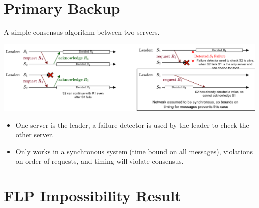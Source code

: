 \section{Primary Backup}
A simple consensus algorithm between two servers.
\begin{center}
    \includegraphics[width=.9\textwidth]{consensus/images/primary_backup_scenarios.drawio.png}
\end{center}
\begin{itemize}
    \item One server is the leader, a failure detector is used by the leader to check the other server.
    \item Only works in a synchronous system (time bound on all messages), violations on order of requests, and timing will violate consensus.
\end{itemize}

\section{FLP Impossibility Result}
% 
%
% 
\unfinished



